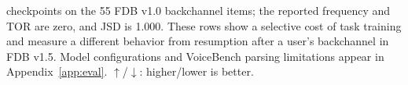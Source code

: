 \begin{table}[tp]
{checkpoints on the 55 FDB v1.0 backchannel items; the reported frequency
and TOR are zero, and JSD is 1.000.
These rows show a selective cost of task training and measure a different behavior from resumption
after a user's backchannel in FDB v1.5. Model configurations and VoiceBench parsing limitations appear in Appendix~\ref{app:eval}. $\uparrow$/$\downarrow$: higher/lower is better.}
\label{tab:retention}
\end{table}

